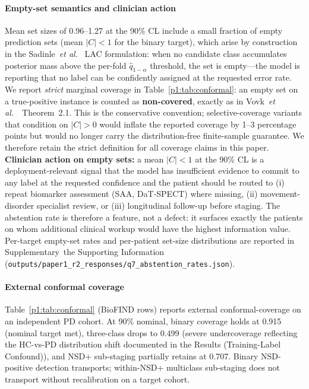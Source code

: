 \documentclass[10pt,letterpaper]{article}
\begin{document}
\paragraph*{Empty-set semantics and clinician action} Mean set sizes of 0.96--1.27 at the 90\% CL include a small fraction of empty prediction sets (mean $|C|<1$ for the binary target), which arise by construction in the Sadinle~\textit{et al.}~\cite{sadinle2019lac} LAC formulation: when no candidate class accumulates posterior mass above the per-fold $\hat{q}_{1-\alpha}$ threshold, the set is empty---the model is reporting that no label can be confidently assigned at the requested error rate. We report \emph{strict} marginal coverage in Table~\ref{p1:tab:conformal}: an empty set on a true-positive instance is counted as \textbf{non-covered}, exactly as in Vovk~\textit{et al.}~\cite{vovk2022}~Theorem~2.1. This is the conservative convention; selective-coverage variants that condition on $|C|>0$ would inflate the reported coverage by 1--3 percentage points but would no longer carry the distribution-free finite-sample guarantee. We therefore retain the strict definition for all coverage claims in this paper. \textbf{Clinician action on empty sets:} a mean $|C|<1$ at the 90\% CL is a deployment-relevant signal that the model has insufficient evidence to commit to any label at the requested confidence and the patient should be routed to (i) repeat biomarker assessment (SAA, DaT-SPECT) where missing, (ii) movement-disorder specialist review, or (iii) longitudinal follow-up before staging. The abstention rate is therefore a feature, not a defect: it surfaces exactly the patients on whom additional clinical workup would have the highest information value. Per-target empty-set rates and per-patient set-size distributions are reported in Supplementary~the Supporting Information (\texttt{outputs/paper1\_r2\_responses/q7\_abstention\_rates.json}).

\paragraph*{External conformal coverage} Table~\ref{p1:tab:conformal} (BioFIND rows) reports external conformal-coverage on an independent PD cohort. At 90\% nominal, binary coverage holds at 0.915 (nominal target met), three-class drops to 0.499 (severe undercoverage reflecting the HC-vs-PD distribution shift documented in the Results (Training-Label Confound)), and NSD+ sub-staging partially retains at 0.707. Binary NSD-positive detection transports; within-NSD+ multiclass sub-staging does not transport without recalibration on a target cohort.
\end{document}
